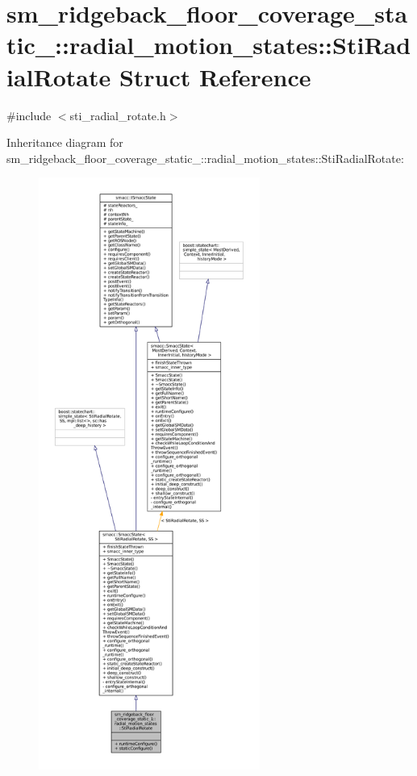 \hypertarget{structsm__ridgeback__floor__coverage__static__1_1_1radial__motion__states_1_1StiRadialRotate}{}\section{sm\+\_\+ridgeback\+\_\+floor\+\_\+coverage\+\_\+static\+\_\+:\+:radial\+\_\+motion\+\_\+states\+:\+:Sti\+Radial\+Rotate Struct Reference}
\label{structsm__ridgeback__floor__coverage__static__1_1_1radial__motion__states_1_1StiRadialRotate}


{\ttfamily \#include $<$sti\+\_\+radial\+\_\+rotate.\+h$>$}



Inheritance diagram for sm\+\_\+ridgeback\+\_\+floor\+\_\+coverage\+\_\+static\+\_\+:\+:radial\+\_\+motion\+\_\+states\+:\+:Sti\+Radial\+Rotate\+:
\nopagebreak
\begin{figure}[H]
\begin{center}
\leavevmode
\includegraphics[height=550pt]{structsm__ridgeback__floor__coverage__static__1_1_1radial__motion__states_1_1StiRadialRotate__inherit__graph}
\end{center}
\end{figure}


